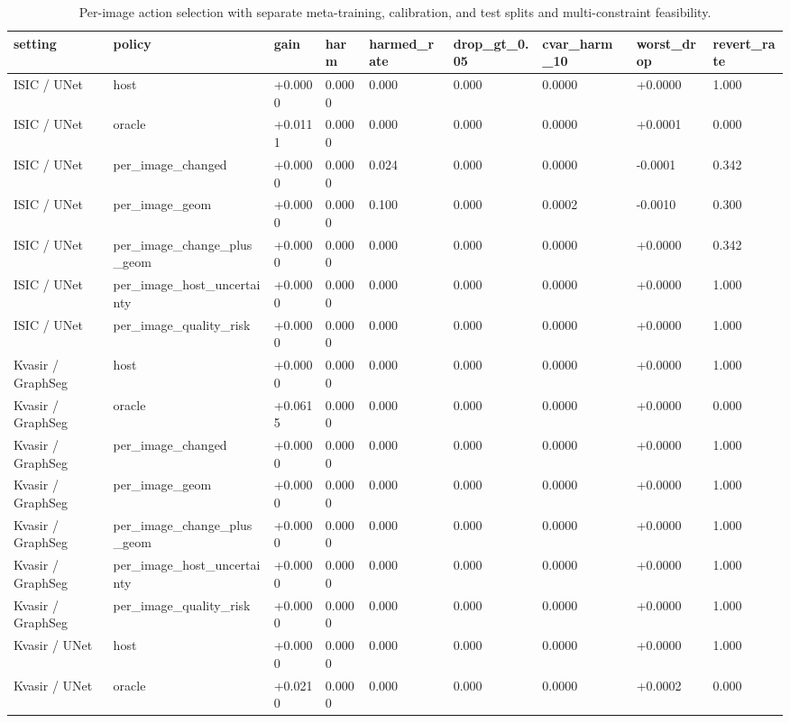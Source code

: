 \begin{table}[t]
\centering
\small
\caption{Per-image action selection with separate meta-training, calibration, and test splits and multi-constraint feasibility.}
\label{tab:per_image_action_selection}
\begin{tabular}{lllllllll}
\toprule
setting & policy & gain & harm & harmed\_rate & drop\_gt\_0.05 & cvar\_harm\_10 & worst\_drop & revert\_rate \\
\midrule
ISIC / UNet & host & +0.0000 & 0.0000 & 0.000 & 0.000 & 0.0000 & +0.0000 & 1.000 \\
ISIC / UNet & oracle & +0.0111 & 0.0000 & 0.000 & 0.000 & 0.0000 & +0.0001 & 0.000 \\
ISIC / UNet & per\_image\_changed & +0.0000 & 0.0000 & 0.024 & 0.000 & 0.0000 & -0.0001 & 0.342 \\
ISIC / UNet & per\_image\_geom & +0.0000 & 0.0000 & 0.100 & 0.000 & 0.0002 & -0.0010 & 0.300 \\
ISIC / UNet & per\_image\_change\_plus\_geom & +0.0000 & 0.0000 & 0.000 & 0.000 & 0.0000 & +0.0000 & 0.342 \\
ISIC / UNet & per\_image\_host\_uncertainty & +0.0000 & 0.0000 & 0.000 & 0.000 & 0.0000 & +0.0000 & 1.000 \\
ISIC / UNet & per\_image\_quality\_risk & +0.0000 & 0.0000 & 0.000 & 0.000 & 0.0000 & +0.0000 & 1.000 \\
Kvasir / GraphSeg & host & +0.0000 & 0.0000 & 0.000 & 0.000 & 0.0000 & +0.0000 & 1.000 \\
Kvasir / GraphSeg & oracle & +0.0615 & 0.0000 & 0.000 & 0.000 & 0.0000 & +0.0000 & 0.000 \\
Kvasir / GraphSeg & per\_image\_changed & +0.0000 & 0.0000 & 0.000 & 0.000 & 0.0000 & +0.0000 & 1.000 \\
Kvasir / GraphSeg & per\_image\_geom & +0.0000 & 0.0000 & 0.000 & 0.000 & 0.0000 & +0.0000 & 1.000 \\
Kvasir / GraphSeg & per\_image\_change\_plus\_geom & +0.0000 & 0.0000 & 0.000 & 0.000 & 0.0000 & +0.0000 & 1.000 \\
Kvasir / GraphSeg & per\_image\_host\_uncertainty & +0.0000 & 0.0000 & 0.000 & 0.000 & 0.0000 & +0.0000 & 1.000 \\
Kvasir / GraphSeg & per\_image\_quality\_risk & +0.0000 & 0.0000 & 0.000 & 0.000 & 0.0000 & +0.0000 & 1.000 \\
Kvasir / UNet & host & +0.0000 & 0.0000 & 0.000 & 0.000 & 0.0000 & +0.0000 & 1.000 \\
Kvasir / UNet & oracle & +0.0210 & 0.0000 & 0.000 & 0.000 & 0.0000 & +0.0002 & 0.000 \\

\end{tabular}
\end{table}
